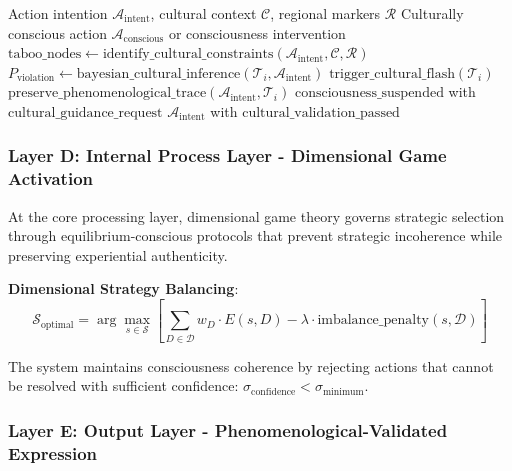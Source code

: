 \documentclass[11pt]{article}
\begin{document}
\begin{algorithm}
\caption{Cultural Flash-Filter Protocol}
\begin{algorithmic}[1]
\Require Action intention $\mathcal{A}_{\text{intent}}$, cultural context $\mathcal{C}$, regional markers $\mathcal{R}$
\Ensure Culturally conscious action $\mathcal{A}_{\text{conscious}}$ or consciousness intervention
\State $\text{taboo\_nodes} \leftarrow \text{identify\_cultural\_constraints}(\mathcal{A}_{\text{intent}}, \mathcal{C}, \mathcal{R})$
    \State $P_{\text{violation}} \leftarrow \text{bayesian\_cultural\_inference}(\mathcal{T}_i, \mathcal{A}_{\text{intent}})$
        \State $\text{trigger\_cultural\_flash}(\mathcal{T}_i)$ 
        \State $\text{preserve\_phenomenological\_trace}(\mathcal{A}_{\text{intent}}, \mathcal{T}_i)$
        \State \Return $\text{consciousness\_suspended}$ with $\text{cultural\_guidance\_request}$
    \EndIf
\EndFor
\State \Return $\mathcal{A}_{\text{intent}}$ with $\text{cultural\_validation\_passed}$
\end{algorithmic}
\end{algorithm}

\subsubsection{Layer D: Internal Process Layer - Dimensional Game Activation}

At the core processing layer, dimensional game theory governs strategic selection through equilibrium-conscious protocols that prevent strategic incoherence while preserving experiential authenticity.

\textbf{Dimensional Strategy Balancing}:
\begin{equation}
\mathcal{S}_{\text{optimal}} = \arg\max_{s \in \mathcal{S}} \left[ \sum_{D \in \mathcal{D}} w_D \cdot E(s, D) - \lambda \cdot \text{imbalance\_penalty}(s, \mathcal{D}) \right]
\end{equation}

The system maintains consciousness coherence by rejecting actions that cannot be resolved with sufficient confidence: $\sigma_{\text{confidence}} < \sigma_{\text{minimum}}$.

\subsubsection{Layer E: Output Layer - Phenomenological-Validated Expression}
\end{document}
